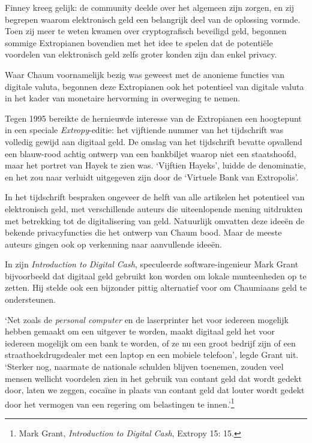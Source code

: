 \documentclass[
  a5paper,
  smalldemyvopaper,11pt,twoside,onecolumn,openright,extrafontsizes,
hidelinks]{memoir}
\begin{document}
Finney kreeg gelijk: de community deelde over het algemeen zijn zorgen,
en zij begrepen waarom elektronisch geld een belangrijk deel van de
oplossing vormde. Toen zij meer te weten kwamen over cryptografisch
beveiligd geld, begonnen sommige Extropianen bovendien met het idee te
spelen dat de potentiële voordelen van elektronisch geld zelfs groter
konden zijn dan enkel privacy.

Waar Chaum voornamelijk bezig was geweest met de anonieme functies van
digitale valuta, begonnen deze Extropianen ook het potentieel van
digitale valuta in het kader van monetaire hervorming in overweging te
nemen.

Tegen 1995 bereikte de hernieuwde interesse van de Extropianen een
hoogtepunt in een speciale \emph{Extropy}-editie: het vijftiende nummer
van het tijdschrift was volledig gewijd aan digitaal geld. De omslag van
het tijdschrift bevatte opvallend een blauw-rood achtig ontwerp van een
bankbiljet waarop niet een staatshoofd, maar het portret van Hayek te
zien was. `Vijftien Hayeks', luidde de denominatie, en het zou naar
verluidt uitgegeven zijn door de `Virtuele Bank van Extropolis'.

In het tijdschrift bespraken ongeveer de helft van alle artikelen het
potentieel van elektronisch geld, met verschillende auteurs die
uiteenlopende mening uitdrukten met betrekking tot de digitalisering van
geld. Natuurlijk omvatten deze ideeën de bekende privacyfuncties die het
ontwerp van Chaum bood. Maar de meeste auteurs gingen ook op verkenning
naar aanvullende ideeën.

In zijn \emph{Introduction to Digital Cash}, speculeerde
software-ingenieur Mark Grant bijvoorbeeld dat digitaal geld gebruikt
kon worden om lokale munteenheden op te zetten. Hij stelde ook een
bijzonder pittig alternatief voor om Chaumiaans geld te ondersteunen.

`Net zoals de \emph{personal computer} en de laserprinter het voor
iedereen mogelijk hebben gemaakt om een uitgever te worden, maakt
digitaal geld het voor iedereen mogelijk om een bank te worden, of ze nu
een groot bedrijf zijn of een straathoekdrugsdealer met een laptop en
een mobiele telefoon', legde Grant uit. `Sterker nog, naarmate de
nationale schulden blijven toenemen, zouden veel mensen wellicht
voordelen zien in het gebruik van contant geld dat wordt gedekt door,
laten we zeggen, cocaïne in plaats van contant geld dat louter wordt
gedekt door het vermogen van een regering om belastingen te
innen.'\footnote{Mark Grant, \emph{Introduction to Digital Cash},
  Extropy 15: 15.}
\end{document}
